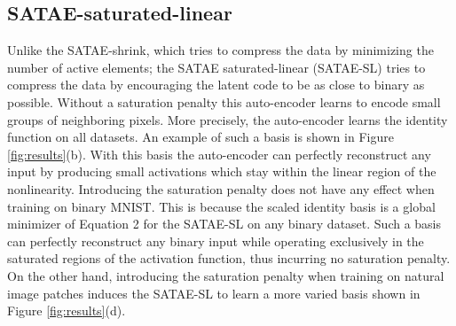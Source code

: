 \documentclass{article} %
\begin{document}
\subsection{SATAE-saturated-linear} 
Unlike the SATAE-shrink, which tries to compress the data by minimizing the number of active elements; the SATAE saturated-linear (SATAE-SL) tries to compress the data by encouraging the latent code to be as close to binary as possible. Without a saturation penalty this auto-encoder learns to encode small groups of neighboring pixels. More precisely, the auto-encoder learns the identity function on all datasets. An example of such a basis is shown in Figure \ref{fig:results}(b). With this basis the auto-encoder can perfectly reconstruct any input by producing small activations which stay within the linear region of the nonlinearity. Introducing the saturation penalty does not have any effect when training on binary MNIST. This is because the scaled identity basis is a global minimizer of Equation 2 for the SATAE-SL on any binary dataset. Such a basis can perfectly reconstruct any binary input while operating exclusively in the saturated regions of the activation function, thus incurring no saturation penalty. On the other hand, introducing the saturation penalty when training on natural image patches induces the SATAE-SL to learn a more varied basis shown in Figure \ref{fig:results}(d). 
\end{document}
